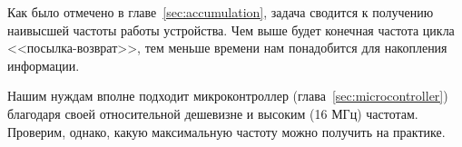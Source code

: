 Как было отмечено в главе~\ref{sec:accumulation}, задача сводится к получению наивысшей частоты работы устройства. Чем выше будет конечная частота цикла <<посылка-возврат>>, тем меньше времени нам понадобится для накопления информации.

Нашим нуждам вполне подходит микроконтроллер (глава~\ref{sec:microcontroller}) благодаря своей относительной дешевизне и высоким (16 МГц) частотам. Проверим, однако, какую максимальную частоту можно получить на практике.
